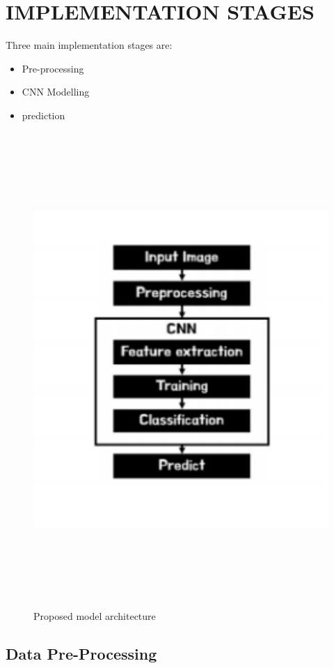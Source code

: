 \documentclass[a4paper,12pt,oneside]{article}
\begin{document}
\newpage
\section{IMPLEMENTATION STAGES}
Three main implementation stages are:
\begin{itemize}
    \item Pre-processing
    \item  CNN Modelling
    \item prediction
\end{itemize}
\begin{figure}[H]
\centering
\includegraphics[height=18cm,width=15cm]{FLOWCHART.PNG}
\caption{Proposed model architecture} 
\end{figure}


\subsection{Data Pre-Processing}
\end{document}
